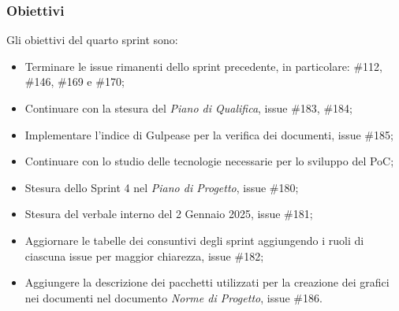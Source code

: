 \subsubsection{Obiettivi}
Gli obiettivi del quarto sprint sono:
\begin{itemize}
    \item Terminare le issue rimanenti dello sprint precedente, in particolare: \#112, \#146, \#169 e \#170;
    \item Continuare con la stesura del \textit{Piano di Qualifica}, issue \#183, \#184;
    \item Implementare l'indice di Gulpease per la verifica dei documenti, issue \#185;
    \item Continuare con lo studio delle tecnologie necessarie per lo sviluppo del PoC;
    \item Stesura dello Sprint 4 nel \textit{Piano di Progetto}, issue \#180;
    \item Stesura del verbale interno del 2 Gennaio 2025, issue \#181;
    \item Aggiornare le tabelle dei consuntivi degli sprint aggiungendo i ruoli di ciascuna issue per maggior chiarezza, issue \#182;
    \item Aggiungere la descrizione dei pacchetti utilizzati per la creazione dei grafici nei documenti nel documento \textit{Norme di Progetto}, issue \#186.
\end{itemize}
